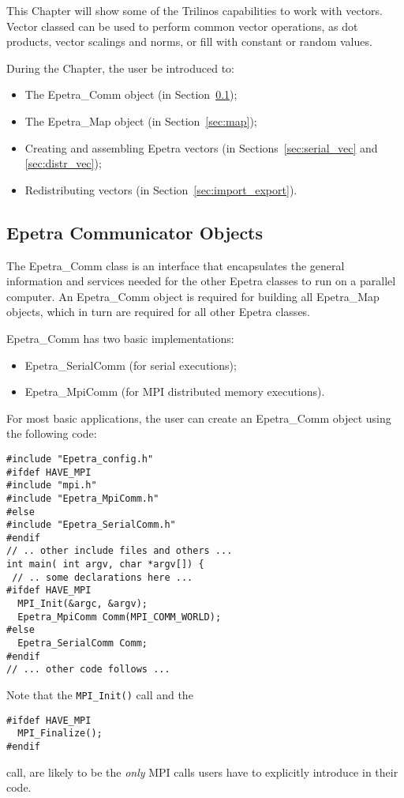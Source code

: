 \medskip

This Chapter will show some of the Trilinos capabilities to work with
vectors. Vector classed can be used to perform common vector operations,
as dot products, vector scalings and norms, or fill with constant or
random values. 

\medskip

During the Chapter, the user be introduced to:
\begin{itemize}
\item The Epetra\_Comm object (in Section~\ref{sec:comm});
\item The Epetra\_Map object (in Section~\ref{sec:map});
\item Creating and assembling Epetra vectors (in
  Sections~\ref{sec:serial_vec} and \ref{sec:distr_vec});
\item Redistributing vectors (in Section~\ref{sec:import_export}).
\end{itemize}


\subsection{Epetra Communicator Objects}
\label{sec:comm}

The Epetra\_Comm class is an interface that encapsulates the general
information and services needed for the other Epetra classes to run on a
parallel computer. An Epetra\_Comm object is required for building all
Epetra\_Map objects, which in turn are required for all other Epetra
classes.

Epetra\_Comm has two basic implementations:
\begin{itemize}
\item Epetra\_SerialComm (for serial executions);
\item Epetra\_MpiComm (for MPI distributed memory executions).
\end{itemize}

For most basic applications, the user can create an Epetra\_Comm object
using the following code:
\begin{verbatim}
#include "Epetra_config.h"
#ifdef HAVE_MPI
#include "mpi.h"
#include "Epetra_MpiComm.h"
#else
#include "Epetra_SerialComm.h"
#endif
// .. other include files and others ...
int main( int argv, char *argv[]) {
 // .. some declarations here ...
#ifdef HAVE_MPI
  MPI_Init(&argc, &argv);
  Epetra_MpiComm Comm(MPI_COMM_WORLD);
#else
  Epetra_SerialComm Comm;
#endif
// ... other code follows ...
\end{verbatim}
Note that the \verb!MPI_Init()! call and the
\begin{verbatim}
#ifdef HAVE_MPI
  MPI_Finalize();
#endif
\end{verbatim}
call, are likely to be the {\em only} MPI calls users have to explicitly
introduce in their code.

